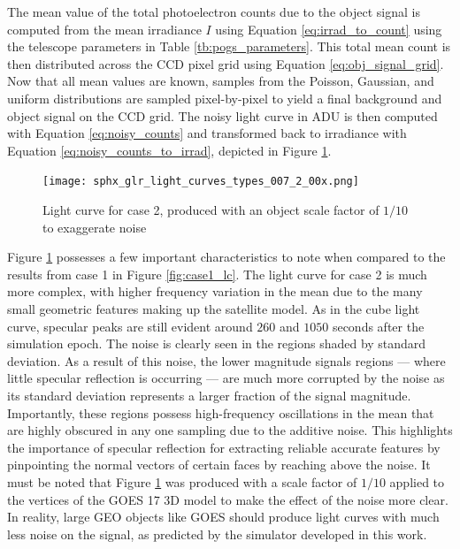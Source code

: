 The mean value of the total photoelectron counts due to the object signal is computed from the mean irradiance $I$ using Equation \ref{eq:irrad_to_count} using the telescope parameters in Table \ref{tb:pogs_parameters}. This total mean count is then distributed across the CCD pixel grid using Equation \ref{eq:obj_signal_grid}. Now that all mean values are known, samples from the Poisson, Gaussian, and uniform distributions are sampled pixel-by-pixel to yield a final background and object signal on the CCD grid. The noisy light curve in ADU is then computed with Equation \ref{eq:noisy_counts} and transformed back to irradiance with Equation \ref{eq:noisy_counts_to_irrad}, depicted in Figure \ref{fig:case2_lc}.

\begin{figure}[!htb]
  \centering
  \texttt{[image: sphx\_glr\_light\_curves\_types\_007\_2\_00x.png]}
  \caption{Light curve for case 2, produced with an object scale factor of $1/10$ to exaggerate noise}
  \label{fig:case2_lc}
\end{figure}

Figure \ref{fig:case2_lc} possesses a few important characteristics to note when compared to the results from case 1 in Figure \ref{fig:case1_lc}. The light curve for case 2 is much more complex, with higher frequency variation in the mean due to the many small geometric features making up the satellite model. As in the cube light curve, specular peaks are still evident around $260$ and $1050$ seconds after the simulation epoch. The noise is clearly seen in the regions shaded by standard deviation. As a result of this noise, the lower magnitude signals regions --- where little specular reflection is occurring --- are much more corrupted by the noise as its standard deviation represents a larger fraction of the signal magnitude. Importantly, these regions possess high-frequency oscillations in the mean that are highly obscured in any one sampling due to the additive noise. This highlights the importance of specular reflection for extracting reliable accurate features by pinpointing the normal vectors of certain faces by reaching above the noise. It must be noted that Figure \ref{fig:case2_lc} was produced with a scale factor of $1/10$ applied to the vertices of the GOES 17 3D model to make the effect of the noise more clear. In reality, large GEO objects like GOES should produce light curves with much less noise on the signal, as predicted by the simulator developed in this work. 